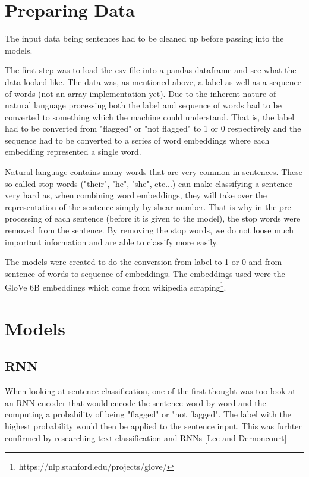 \documentclass[twoside,twocolumn]{article}
\begin{document}
\section{Preparing Data}
The input data being sentences had to be cleaned up before passing into the models.

The first step was to load the csv file into a pandas dataframe and see what the data looked like.
The data was, as mentioned above, a label as well as a sequence of words (not an array implementation yet).
Due to the inherent nature of natural language processing both the label and sequence of words had to
be converted to something which the machine could understand. That is, the label had to be converted from 
"flagged" or "not flagged" to 1 or 0 respectively and the sequence had to be converted to a series of word
embeddings where each embedding represented a single word.

Natural language contains many words that are very common in sentences. These so-called stop words
 ("their", "he", "she", etc...) can make classifying a sentence very hard as, when combining word
 embeddings, they will take over the representation of the sentence simply by shear number. That is 
 why in the pre-processing of each sentence (before it is given to the model), the stop words were removed
 from the sentence. By removing the stop words, we do not loose much important information and
 are able to classify more easily.

The models were created to do the conversion from label to 1 or 0 and from sentence of words to sequence of embeddings.
The embeddings used were the GloVe 6B embeddings which come from wikipedia scraping\footnote{https://nlp.stanford.edu/projects/glove/}.


\section{Models}

\subsection{RNN}

When looking at sentence classification, one of the first thought was too look at an RNN encoder
that would encode the sentence word by word and the computing a probability of being "flagged"
or "not flagged". The label with the highest probability would then be applied to the sentence input.
This was furhter confirmed by researching text classification and RNNs [Lee and Dernoncourt]
\end{document}
